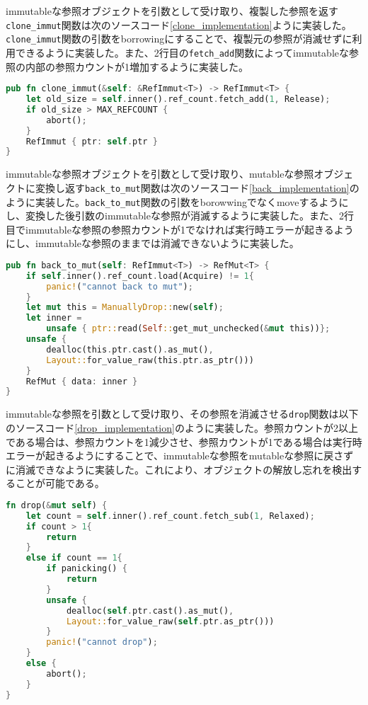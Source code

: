 \documentclass{sumiilab-paper}
\theoremstyle{mystyle}
\numberwithin{definition}{chapter} %
\begin{document}
immutableな参照オブジェクトを引数として受け取り、複製した参照を返す\texttt{clone\_immut}関数は次のソースコード\ref{clone_implementation}ように実装した。\texttt{clone\_immut}関数の引数をborrowingにすることで、複製元の参照が消滅せずに利用できるように実装した。また、2行目の\texttt{fetch\_add}関数によってimmutableな参照の内部の参照カウントが1増加するように実装した。
\begin{lstlisting}[language=Rust, caption=関数clone\_immutの実装, label=clone_implementation, captionpos=b]
pub fn clone_immut(&self: &RefImmut<T>) -> RefImmut<T> {
    let old_size = self.inner().ref_count.fetch_add(1, Release);
    if old_size > MAX_REFCOUNT {
        abort();
    }
    RefImmut { ptr: self.ptr }
}
\end{lstlisting}

immutableな参照オブジェクトを引数として受け取り、mutableな参照オブジェクトに変換し返す\texttt{back\_to\_mut}関数は次のソースコード\ref{back_implementation}のように実装した。\texttt{back\_to\_mut}関数の引数をborowwingでなくmoveするようにし、変換した後引数のimmutableな参照が消滅するように実装した。また、2行目でimmutableな参照の参照カウントが1でなければ実行時エラーが起きるようにし、immutableな参照のままでは消滅できないように実装した。
\begin{lstlisting}[language=Rust, caption=関数back\_to\_mutの実装, label=back_implementation, captionpos=b]
pub fn back_to_mut(self: RefImmut<T>) -> RefMut<T> {
    if self.inner().ref_count.load(Acquire) != 1{
        panic!("cannot back to mut");
    }
    let mut this = ManuallyDrop::new(self);
    let inner =
        unsafe { ptr::read(Self::get_mut_unchecked(&mut this))};
    unsafe {
        dealloc(this.ptr.cast().as_mut(), 
        Layout::for_value_raw(this.ptr.as_ptr()))
    }
    RefMut { data: inner }
}
\end{lstlisting}

immutableな参照を引数として受け取り、その参照を消滅させる\texttt{drop}関数は以下のソースコード\ref{drop_implementation}のように実装した。参照カウントが2以上である場合は、参照カウントを1減少させ、参照カウントが1である場合は実行時エラーが起きるようにすることで、immutableな参照をmutableな参照に戻さずに消滅できなように実装した。これにより、オブジェクトの解放し忘れを検出することが可能である。
\begin{lstlisting}[language=Rust, caption=関数back\_to\_mutの実装, label=drop_implementation, captionpos=b]
fn drop(&mut self) {
    let count = self.inner().ref_count.fetch_sub(1, Relaxed);
    if count > 1{
        return
    }
    else if count == 1{
        if panicking() {
            return
        }
        unsafe {
            dealloc(self.ptr.cast().as_mut(), 
            Layout::for_value_raw(self.ptr.as_ptr()))
        }
        panic!("cannot drop");
    }
    else {
        abort();
    }
}
\end{lstlisting}
\end{document}
